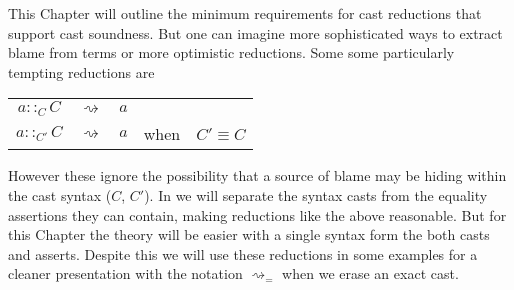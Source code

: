 This Chapter will outline the minimum requirements for cast reductions that support cast soundness.
But one can imagine more sophisticated ways to extract blame from terms or more optimistic reductions.
Some some particularly tempting reductions are

\begin{tabular}{ccccc}
$a::_{C}C$ & $\rightsquigarrow$ & $a$ &  & \tabularnewline
$a::_{C'}C$ & $\rightsquigarrow$ & $a$ & when & $C'\equiv C$\tabularnewline
\end{tabular}

However these ignore the possibility that a source of blame may be hiding within the cast syntax ($C$, $C'$).
In  we will separate the syntax casts from the equality assertions they can contain, making reductions like the above reasonable.
But for this Chapter the theory will be easier with a single syntax form the both casts and asserts.
Despite this we will use these reductions in some examples for a cleaner presentation with the notation $\rightsquigarrow_{=}$ when we erase an exact cast. %





